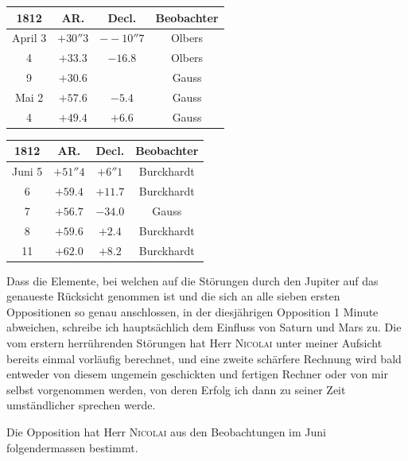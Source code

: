 \begin{center}\fontsize{10}{12}\selectfont\setlength{\tabcolsep}{6pt}\renewcommand{\arraystretch}{1.15}\begin{tabular}{c|c|c|c}
1812 & AR. & Decl. & Beobachter\\\hline
April 3 & $+30''3$ & $-\!-10''7$ & Olbers\\
4 & $+33.3$ & $-16.8$ & Olbers\\
9 & $+30.6$ &  & Gauss\\
Mai 2 & $+57.6$ & $-5.4$ & Gauss\\
4 & $+49.4$ & $+6.6$ & Gauss\\
\end{tabular}\end{center}
\begin{center}\fontsize{10}{12}\selectfont\setlength{\tabcolsep}{6pt}\renewcommand{\arraystretch}{1.15}\begin{tabular}{c|c|c|c}
1812 & AR. & Decl. & Beobachter\\\hline
Juni 5 & $+51''4$ & $+6''1$ & Burckhardt\\
6 & $+59.4$ & $+11.7$ & Burckhardt\\
7 & $+56.7$ & $-34.0$ & Gauss\\
8 & $+59.6$ & $+2.4$ & Burckhardt\\
11 & $+62.0$ & $+8.2$ & Burckhardt\\
\end{tabular}\end{center}

\par\indent Dass die Elemente, bei welchen auf die Störungen durch den Jupiter auf das genaueste Rücksicht
genommen ist und die sich an alle sieben ersten Oppositionen so genau anschlossen, in der diesjährigen
Opposition 1 Minute abweichen, schreibe ich hauptsächlich dem Einfluss von Saturn und Mars
zu. Die vom erstern herrührenden Störungen hat Herr \textsc{Nicolai} unter meiner Aufsicht bereits einmal
vorläufig berechnet, und eine zweite schärfere Rechnung wird bald entweder von diesem ungemein geschickten
und fertigen Rechner oder von mir selbst vorgenommen werden, von deren Erfolg ich dann
zu seiner Zeit umständlicher sprechen werde.

\par\indent Die Opposition hat Herr \textsc{Nicolai} aus den Beobachtungen im Juni folgendermassen bestimmt.

